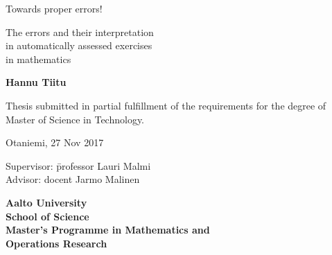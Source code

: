   {\parindent0pt %
  \begin{spacing}{1.1}

   {\sffamily{}}
  \end{spacing}

  \vspace{12.7mm}

  \begin{spacing}{1.63}
  {\fontsize{17.8pt}{17.8pt}\selectfont Towards proper errors!}
  \end{spacing}

  \vspace{10.5mm}

  \begin{spacing}{1.2}
  {\fontsize{13pt}{13pt}\selectfont The errors and their interpretation\\in automatically assessed exercises\\in mathematics}
  \end{spacing}

  \vspace{10.6mm}

  {\fontsize{13.9pt}{13.9pt}\bfseries\sffamily\lsstyle Hannu Tiitu}

  \vfill

  {\fontsize{10.3pt}{10.3pt}\sffamily\lsstyle\raggedright
  \begin{spacing}{1.06}

  Thesis submitted in partial fulfillment of the requirements for the
  degree of Master of Science in Technology.

  Otaniemi, 27 Nov 2017

  \begin{tabbing}
  Supervisor:\hspace{6mm} \= professor Lauri Malmi \\
  Advisor: \> docent Jarmo Malinen
  \end{tabbing}
  \vspace{-4mm}
  \end{spacing}
  } %

  \vspace{11.5mm}

  \begin{spacing}{.9}
  {\bfseries\sffamily\lsstyle Aalto University \\
  School of Science \\
  Master's Programme in Mathematics and\\Operations Research}
  \end{spacing}
  } %



